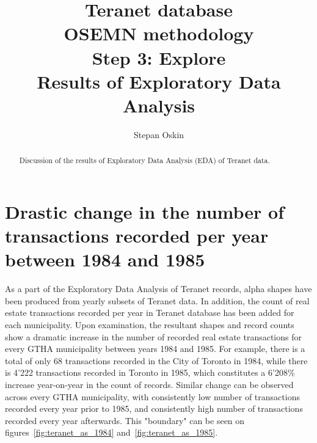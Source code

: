 \documentclass[11pt]{article}
\begin{document}
    \title{Teranet database \\
    OSEMN methodology \\
    Step 3: Explore \\
    Results of Exploratory Data Analysis}
    \author{Stepan Oskin}

    \maketitle

    \begin{abstract}
    Discussion of the results of Exploratory Data Analysis (EDA) of Teranet data.
    \end{abstract}

    \section{Drastic change in the number of transactions recorded per year between 1984 and 1985} \label{sec:num_records_change}

    As a part of the Exploratory Data Analysis of Teranet records, alpha shapes have been produced from yearly subsets of Teranet data.
    In addition, the count of real estate transactions recorded per year in Teranet database has been added for each municipality.
    Upon examination, the resultant shapes and record counts show a dramatic increase in the number of recorded real estate transactions for every GTHA municipality between years 1984 and 1985.
    For example, there is a total of only 68 transactions recorded in the City of Toronto in 1984, while there is 4'222 transactions recorded in Toronto in 1985, which constitutes a 6'208\% increase year-on-year in the count of records.
    Similar change can be observed across every GTHA municipality, with consistently low number of transactions recorded every year prior to 1985, and consistently high number of transactions recorded every year afterwards.
    This "boundary" can be seen on figures~\ref{fig:teranet_as_1984} and~\ref{fig:teranet_as_1985}.
\end{document}
